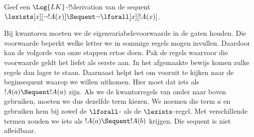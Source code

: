 \documentclass[openany]{memoir}
\begin{document}
\begingroup
\def\olfilename{OLP-0076}
\def\olfilepath{content/first-order-logic/sequent-calculus/}
\hypertarget{unit-OLP-0076}{}





\begin{ex}
Geef een $\Log{LK}$-!!{derivation} van de sequent
$\lexists[x][\lnot !A(x)] \Sequent \lnot \lforall[x][!A(x)]$.

Bij kwantoren moeten we de eigenvariabelevoorwaarde in de gaten
houden. Die voorwaarde beperkt welke letter we in sommige regels mogen
invullen. Daardoor kan de volgorde van onze stappen ertoe doen. Pak de
regels waarvoor die voorwaarde geldt het liefst als eerste aan. In het
afgemaakte bewijs komen zulke regels dan lager te staan.
Daarnaast helpt het om vooruit te kijken naar de beginsequent waarop
we willen uitkomen. Hier moet dat iets als $!A(a) \Sequent !A(a)$ zijn.
Als we de kwantorregels van onder naar boven gebruiken, moeten we dus
dezelfde term kiezen. We noemen die term $a$ en gebruiken hem bij zowel
de $\lforall$- als de $\lexists$-regel. Met verschillende termen zouden
we iets als $!A(a) \Sequent !A(b)$ krijgen. Die sequent is niet
afleidbaar.


\end{ex}
\end{document}
